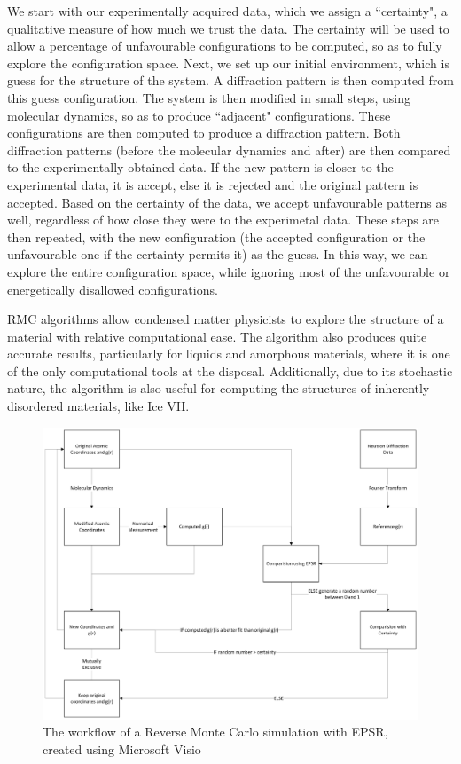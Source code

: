 \documentclass[a4paper,11pt]{article}
\begin{document}
We start with our experimentally acquired data, which we assign a ``certainty", a qualitative measure of how much we trust the data. The certainty will be used to allow a percentage of unfavourable configurations to be computed, so as to fully explore the configuration space. Next, we set up our initial environment, which is guess for the structure of the system. A diffraction pattern is then computed from this guess configuration. The system is then modified in small steps, using molecular dynamics, so as to produce ``adjacent" configurations. These configurations are then computed to produce a diffraction pattern. Both diffraction patterns (before the molecular dynamics and after) are then compared to the experimentally obtained data. If the new pattern is closer to the experimental data, it is accept, else it is rejected and the original pattern is accepted. Based on the certainty of the data, we accept unfavourable patterns as well, regardless of how close they were to the experimetal data. These steps are then repeated, with the new configuration (the accepted configuration or the unfavourable one if the certainty permits it) as the guess. In this way, we can explore the entire configuration space, while ignoring most of the unfavourable or energetically disallowed configurations.

RMC algorithms allow condensed matter physicists to explore the structure of a material with relative computational ease. The algorithm also produces quite accurate results, particularly for liquids and amorphous materials, where it is one of the only computational tools at the disposal. Additionally, due to its stochastic nature, the algorithm is also useful for computing the structures of inherently disordered materials, like Ice VII.

\begin{figure}
  \centering
  \includegraphics[width=\textwidth]{images/RMCWorkflow.png}
  \caption{The workflow of a Reverse Monte Carlo simulation with EPSR, created using Microsoft Visio}
  \label{fig:rmc-workflow}
\end{figure}
\end{document}
